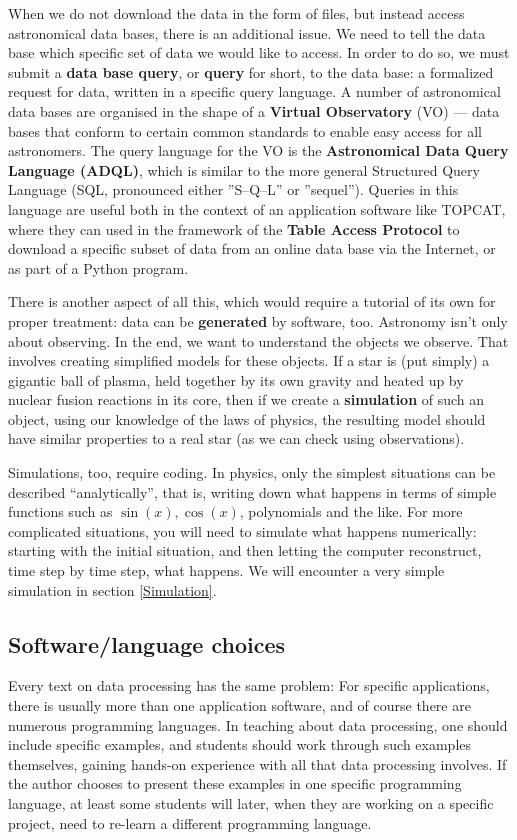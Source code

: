\documentclass[twocolumn,apj]{openjournal}
\begin{document}
When we do not download the data in the form of files, but instead access astronomical data bases, there is an additional issue. We need to tell the data base which specific set of data we would like to access. In order to do so, we must submit a {\bf data base query}, or {\bf query} for short, to the data base: a formalized request for data, written in a specific query language.  A number of astronomical data bases are organised in the shape of a {\bf Virtual Observatory} (VO) --- data bases that conform to certain common standards to enable easy access for all astronomers. The query language for the VO is the {\bf Astronomical Data Query Language (ADQL)}, which is similar to the more general Structured Query Language (SQL, pronounced either ''S--Q--L'' or ''sequel''). Queries in this language are useful both in the context of an application software like TOPCAT, where they can used in the framework of the {\bf Table Access Protocol} to download a specific subset of data from an online data base via the Internet, or as part of a Python program.

There is another aspect of all this, which would require a tutorial of its own for proper treatment: data can be {\bf generated} by software, too. Astronomy isn't only about observing. In the end, we want to understand the objects we observe. That involves creating simplified models for these objects. If a star is (put simply) a gigantic ball of plasma, held together by its own gravity and heated up by nuclear fusion reactions in its core, then if we create a {\bf simulation} of such an object, using our knowledge of the laws of physics, the resulting model should have similar properties to a real star (as we can check using observations).

Simulations, too, require coding. In physics, only the simplest situations can be described ``analytically'', that is, writing down what happens in terms of simple functions such as $\sin(x), \cos(x)$, polynomials and the like. For more complicated situations, you will need to simulate what happens numerically: starting with the initial situation, and then letting the computer reconstruct, time step by time step, what happens. We will encounter a very simple simulation in section \ref{Simulation}.

\subsection{Software/language choices}

Every text on data processing has the same problem: For specific applications, there is usually more than one application software, and of course there are numerous programming languages. In teaching about data processing, one should include specific examples, and students should work through such examples themselves, gaining hands-on experience with all that data processing involves. If the author chooses to present these examples in one specific programming language, at least some students will later, when they are working on a specific project, need to re-learn a different programming language.
\end{document}
